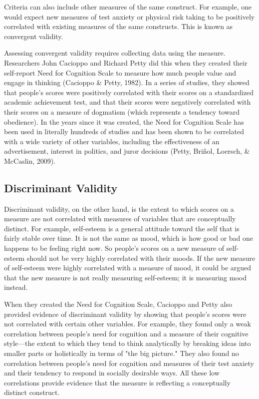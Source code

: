 Criteria can also include other measures of the same construct. For example, one would expect new measures of test anxiety or physical risk taking to be positively correlated with existing measures of the same constructs. This is known as convergent validity.

Assessing convergent validity requires collecting data using the measure. Researchers John Cacioppo and Richard Petty did this when they created their self-report Need for Cognition Scale to measure how much people value and engage in thinking (Cacioppo \& Petty, 1982). In a series of studies, they showed that people's scores were positively correlated with their scores on a standardized academic achievement test, and that their scores were negatively correlated with their scores on a measure of dogmatism (which represents a tendency toward obedience). In the years since it was created, the Need for Cognition Scale has been used in literally hundreds of studies and has been shown to be correlated with a wide variety of other variables, including the effectiveness of an advertisement, interest in politics, and juror decisions (Petty, Briñol, Loersch, \& McCaslin, 2009).

\subsection{Discriminant Validity}

Discriminant validity, on the other hand, is the extent to which scores on a measure are not correlated with measures of variables that are conceptually distinct. For example, self-esteem is a general attitude toward the self that is fairly stable over time. It is not the same as mood, which is how good or bad one happens to be feeling right now. So people's scores on a new measure of self-esteem should not be very highly correlated with their moods. If the new measure of self-esteem were highly correlated with a measure of mood, it could be argued that the new measure is not really measuring self-esteem; it is measuring mood instead.

When they created the Need for Cognition Scale, Cacioppo and Petty also provided evidence of discriminant validity by showing that people's scores were not correlated with certain other variables. For example, they found only a weak correlation between people's need for cognition and a measure of their cognitive style—the extent to which they tend to think analytically by breaking ideas into smaller parts or holistically in terms of "the big picture." They also found no correlation between people's need for cognition and measures of their test anxiety and their tendency to respond in socially desirable ways. All these low correlations provide evidence that the measure is reflecting a conceptually distinct construct.


